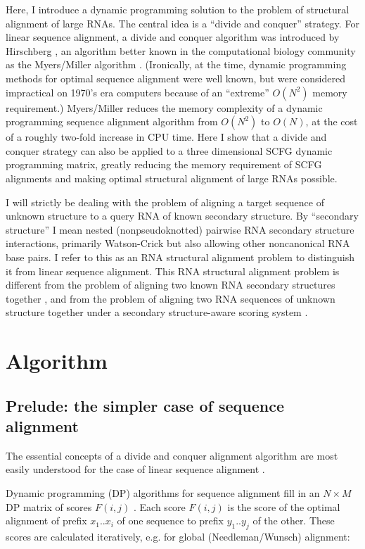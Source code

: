 \documentclass[11pt]{article}
\begin{document}
Here, I introduce a dynamic programming solution to the problem of
structural alignment of large RNAs. The central idea is a ``divide and
conquer'' strategy. For linear sequence alignment, a divide and
conquer algorithm was introduced by Hirschberg \cite{Hirschberg75}, an
algorithm better known in the computational biology community as the
Myers/Miller algorithm \cite{MyM-88a}. (Ironically, at the time,
dynamic programming methods for optimal sequence alignment were well
known, but were considered impractical on 1970's era computers because
of an ``extreme'' $O(N^2)$ memory requirement.) Myers/Miller reduces
the memory complexity of a dynamic programming sequence alignment
algorithm from $O(N^2)$ to $O(N)$, at the cost of a roughly two-fold
increase in CPU time. Here I show that a divide and conquer strategy
can also be applied to a three dimensional SCFG dynamic programming
matrix, greatly reducing the memory requirement of SCFG alignments and
making optimal structural alignment of large RNAs possible.

I will strictly be dealing with the problem of aligning a target
sequence of unknown structure to a query RNA of known secondary
structure. By ``secondary structure'' I mean nested (nonpseudoknotted)
pairwise RNA secondary structure interactions, primarily Watson-Crick
but also allowing other noncanonical RNA base pairs. I refer to this
as an RNA structural alignment problem to distinguish it from linear
sequence alignment. This RNA structural alignment problem is different
from the problem of aligning two known RNA secondary structures
together \cite{Shapiro90}, and from the problem of aligning two RNA
sequences of unknown structure together under a secondary
structure-aware scoring system
\cite{Sankoff85,Gorodkin01,MathewsTurner02}.

\section{Algorithm}

\subsection{Prelude: the simpler case of sequence alignment}

The essential concepts of a divide and conquer alignment algorithm are
most easily understood for the case of linear sequence alignment
\cite{Hirschberg75,MyM-88a}.

Dynamic programming (DP) algorithms for sequence alignment fill in an
$N \times M$ DP matrix of scores $F(i,j)$
\cite{Needleman70,Smith81}. Each score $F(i,j)$ is the score of the
optimal alignment of prefix $x_1..x_i$ of one sequence to prefix
$y_1..y_j$ of the other. These scores are calculated iteratively, e.g.
for global (Needleman/Wunsch) alignment:
\end{document}
